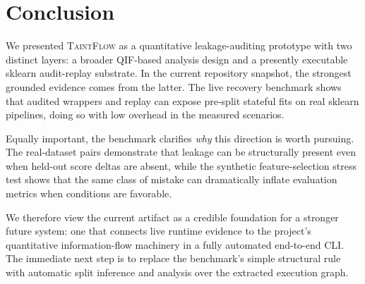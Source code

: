 \documentclass[11pt]{article}
\begin{document}
\section{Conclusion}\label{sec:conclusion}

We presented \textsc{TaintFlow} as a quantitative leakage-auditing
prototype with two distinct layers: a broader QIF-based analysis design
and a presently executable sklearn audit-replay substrate.  In the
current repository snapshot, the strongest grounded evidence comes from
the latter.  The live recovery benchmark shows that audited wrappers
and replay can expose pre-split stateful fits on real sklearn
pipelines, doing so with low overhead in the measured scenarios.

Equally important, the benchmark clarifies \emph{why} this direction is
worth pursuing.  The real-dataset pairs demonstrate that leakage can be
structurally present even when held-out score deltas are absent, while
the synthetic feature-selection stress test shows that the same class
of mistake can dramatically inflate evaluation metrics when conditions
are favorable.

We therefore view the current artifact as a credible foundation for a
stronger future system: one that connects live runtime evidence to the
project's quantitative information-flow machinery in a fully automated
end-to-end CLI.  The immediate next step is to replace the benchmark's
simple structural rule with automatic split inference and analysis over
the extracted execution graph.
\end{document}
